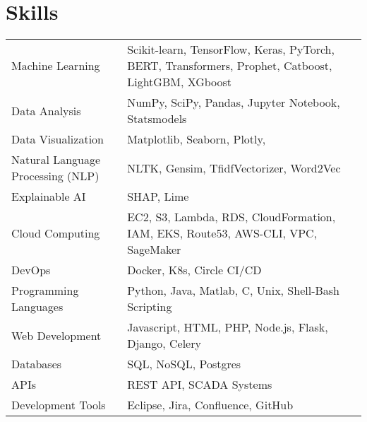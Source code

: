 \documentclass[a4paper,12pt]{article}
\begin{document}
\section{Skills}
\begin{tabularx}{\linewidth}{@{}l X@{}}
    Machine Learning & \normalsize{Scikit-learn, TensorFlow, Keras, PyTorch, BERT, Transformers, Prophet, Catboost, LightGBM, XGboost}\\
    Data Analysis & \normalsize{NumPy, SciPy, Pandas, Jupyter Notebook, Statsmodels}\\
    Data Visualization & \normalsize{Matplotlib, Seaborn, Plotly, }\\
    Natural Language Processing (NLP) & \normalsize{NLTK, Gensim, TfidfVectorizer, Word2Vec}\\
    Explainable AI & \normalsize{SHAP, Lime}\\
    Cloud Computing & \normalsize{EC2, S3, Lambda, RDS, CloudFormation, IAM, EKS, Route53, AWS-CLI, VPC, SageMaker}\\
    DevOps & \normalsize{Docker, K8s, Circle CI/CD}\\
    Programming Languages & \normalsize{Python, Java, Matlab, C, Unix, Shell-Bash Scripting}\\
    Web Development & \normalsize{Javascript, HTML, PHP, Node.js, Flask, Django, Celery}\\
    Databases & \normalsize{SQL, NoSQL, Postgres}\\
    APIs & \normalsize{REST API, SCADA Systems}\\
    Development Tools & \normalsize{Eclipse, Jira, Confluence, GitHub}\\
    \end{tabularx}

\vfill
\end{document}
